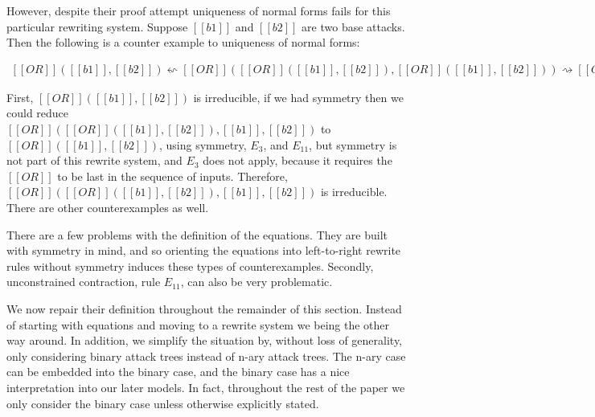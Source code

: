 However, despite their proof attempt uniqueness of normal forms fails
for this particular rewriting system.  Suppose $[[b1]]$ and $[[b2]]$
are two base attacks.  Then the following is a counter example to
uniqueness of normal forms:
\begin{center}
  \begin{math}
    \begin{array}{lll}
      [[OR]]([[b1]],[[b2]])
      \leftsquigarrow
      [[OR]]([[OR]]([[b1]],[[b2]]),[[OR]]([[b1]],[[b2]]))
      \rightsquigarrow
          [[OR]]([[OR]]([[b1]],[[b2]]),[[b1]],[[b2]])
    \end{array}
  \end{math}
\end{center}
First, $[[OR]]([[b1]],[[b2]])$ is irreducible, if we had symmetry then
we could reduce \\ $[[OR]]([[OR]]([[b1]],[[b2]]),[[b1]],[[b2]])$ to
$[[OR]]([[b1]],[[b2]])$, using symmetry, $E_3$, and $E_{11}$, but
symmetry is not part of this rewrite system, and $E_3$ does not apply,
because it requires the $[[OR]]$ to be last in the sequence of inputs.
Therefore, $[[OR]]([[OR]]([[b1]],[[b2]]),[[b1]],[[b2]])$ is
irreducible.  There are other counterexamples as well.  

There are a few problems with the definition of the equations.  They
are built with symmetry in mind, and so orienting the equations into
left-to-right rewrite rules without symmetry induces these types of
counterexamples.  Secondly, unconstrained contraction, rule $E_{11}$,
can also be very problematic.

We now repair their definition throughout the remainder of this
section.  Instead of starting with equations and moving to a rewrite
system we being the other way around.  In addition, we simplify the
situation by, without loss of generality, only considering binary
attack trees instead of n-ary attack trees.  The n-ary case can be
embedded into the binary case, and the binary case has a nice
interpretation into our later models.  In fact, throughout the rest of
the paper we only consider the binary case unless otherwise explicitly
stated.

